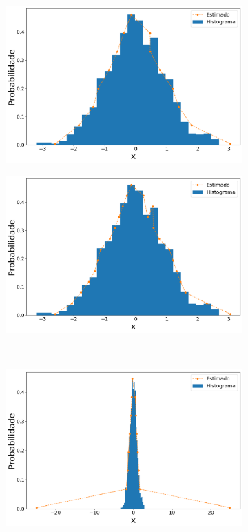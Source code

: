 \begin{figure}[H]
	\centering\begin{subfigure}[b]{0.45\textwidth}
		\centering 
		\includegraphics[width=\linewidth]{./figuras/PDFm_normal_15_1000_0}
		\caption{}
		\label{fig:pdfm_norm15_data}
	\end{subfigure}
	\hfill
	\begin{subfigure}[b]{0.45\textwidth}
		\centering 
		\includegraphics[width=\linewidth]{./figuras/PDFm_normal_25_1000_0}
		\caption{}
		\label{fig:pdfm_norm25_data}
	\end{subfigure}
	\\
	\begin{subfigure}[b]{0.45\textwidth}
		\centering 
		\includegraphics[width=\linewidth]{./figuras/PDFm_normal_15_1000_25}

\end{subfigure}
\end{figure}
